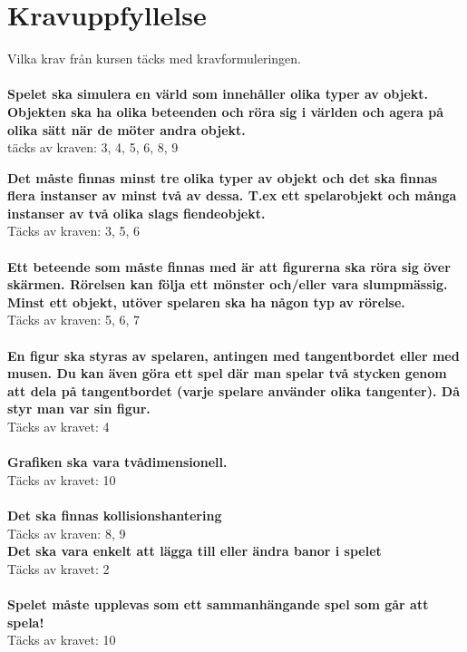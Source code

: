 \documentclass{TDP005mall}
\begin{document}
\section{Kravuppfyllelse}
Vilka krav från kursen täcks med kravformuleringen.\\\\
\textbf{Spelet ska simulera en värld som innehåller olika typer av objekt. Objekten ska ha olika beteenden och röra sig i världen och agera på olika sätt när de möter andra objekt.}
\\
täcks av kraven: 3, 4, 5, 6, 8, 9

\textbf{Det måste finnas minst tre olika typer av objekt och det ska finnas flera instanser av minst två av dessa. T.ex ett spelarobjekt och många instanser av två olika slags fiendeobjekt.}
\\
Täcks av kraven: 3, 5, 6
\\\\
\textbf{Ett beteende som måste finnas med är att figurerna ska röra sig över skärmen. Rörelsen kan följa ett mönster och/eller vara slumpmässig. Minst ett objekt, utöver spelaren ska ha någon typ av rörelse.}
\\
Täcks av kraven: 5, 6, 7 
\\\\
\textbf{En figur ska styras av spelaren, antingen med tangentbordet eller med musen. Du kan även göra ett spel där man spelar två stycken genom att dela på tangentbordet (varje spelare använder olika tangenter). Då styr man var sin figur.}
\\
Täcks av kravet: 4  
\\\\
\textbf{Grafiken ska vara tvådimensionell.}
\\
Täcks av kravet: 10
\\\\
\textbf{Det ska finnas kollisionshantering}
\\
Täcks av kraven: 8, 9 
\\
\textbf{Det ska vara enkelt att lägga till eller ändra banor i spelet}
\\
Täcks av kravet: 2
\\\\
\textbf{Spelet måste upplevas som ett sammanhängande spel som går att spela!}
\\
Täcks av kravet: 10
\end{document}

